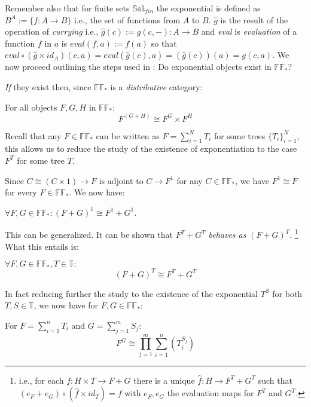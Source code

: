  Remember also that for finite sets $\mathbb{Set}_{fin}$  the exponential is defined as  $B^A := \{f : A \rightarrow B\}$ i.e., the set of functions from $A$ to $B$. \newline
 $\hat{g}$ is the result of the operation of \emph{currying} i.e., $\hat{g}(c) := g(c,-) : A \rightarrow B$ and \emph{eval} is \emph{evaluation} of a function $f$ in $a$ is $eval(f,a) := f(a)$ so that $eval \circ (\hat{g}\times id_A)(c,a) = eval(\hat{g}(c),a)=(\hat{g}(c))(a)=g(c,a)$.\newline
 \newline
 We now proceed outlining the steps used in \cite{towards}:\newline
 \newline
 Do exponential objects exist in $\mathbb{FF}_*$? \newline
 
 \emph{If} they exist then, since $\mathbb{FF}_*$ is a \emph{distributive} category:
 \begin{lem}
 	For all objects $ F,G,H $ in $\mathbb{FF}_* :$
 	\[ F^{(G+H)} \cong F^G \times F^H \]
 \end{lem}

Recall that any $F \in \mathbb{FF}_*$ can be written as $F= \sum_{i=1}^{N} T_i $ for some trees $\{T_i\}_{i=1}^N$, this allows us to reduce the study of the existence of exponentiation to the case $F^T$ for some tree $T$.\newline

Since $ C \cong (C \times 1) \rightarrow F$ is adjoint to $ C \rightarrow F^1 $ for any $C \in \mathbb{FF}_*$, we have $F^1 \cong F$ for every $F \in \mathbb{FF}_*$.
We now have:
\begin{remark}
	$\forall F,G \in \mathbb{FF}_* : (F+G)^1 \cong F^1 + G^1$.
\end{remark}
This can be generalized.
It can be shown that $F^T + G^T$ \emph{behaves as} $(F+G)^T$. \footnote{i.e., for each $f: H \times T \rightarrow F + G$ there is a unique $\hat{f}: H \rightarrow F^T + G^T$ such that $(e_F + e_G)\circ(\hat{f} \times id_T)=f$ with $e_F,e_G$ the evaluation maps for $F^T$ and $G^T$.}
\newline
What this entails is:
\begin{lem}$\forall F,G \in \mathbb{FF}_*, T \in \mathbb{T} :$
	\[ (F+G)^T \cong F^T + G^T\]
\end{lem}

In fact reducing further the study to the existence of the exponential $T^S$ for both $T,S \in \mathbb{T}$,
we now have for $F,G \in \mathbb{FF}_*$:
\begin{thm}
	For $ F = \sum_{i=1}^{n} T_i $ and $ G = \sum_{j=1}^{m} S_j :$
	\[ F^G \cong \prod_{j=1}^{m} \sum_{i=1}^{n} (T_i^{S_j}) \] 
\end{thm}


